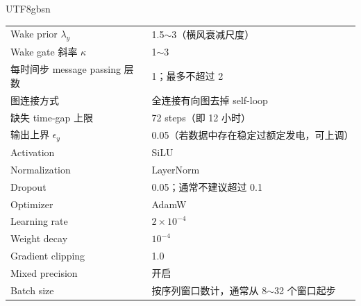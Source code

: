 \documentclass[11pt]{article}
\begin{document}
\begin{CJK}{UTF8}{gbsn}
\begin{table}[!ht]
\begin{tabularx}{0.96\linewidth}{@{}lX@{}}
Wake prior \(\lambda_y\)              & 1.5\(\sim\)3（横风衰减尺度）                                                      \\
Wake gate 斜率 \(\kappa\)             & 1\(\sim\)3                                                                       \\
每时间步 message passing 层数          & 1；最多不超过 2                                                                    \\
图连接方式                             & 全连接有向图去掉 self-loop                                                        \\
缺失 time-gap 上限                     & 72 steps（即 12 小时）                                                             \\
输出上界 $\epsilon_y$                 & 0.05（若数据中存在稳定过额定发电，可上调）                                             \\
Activation                             & SiLU                                                                              \\
Normalization                          & LayerNorm                                                                         \\
Dropout                                & 0.05；通常不建议超过 0.1                                                          \\
Optimizer                              & AdamW                                                                             \\
Learning rate                          & \(2\times 10^{-4}\)                                                               \\
Weight decay                           & \(10^{-4}\)                                                                       \\
Gradient clipping                      & 1.0                                                                               \\
Mixed precision                        & 开启                                                                              \\
Batch size                             & 按序列窗口数计，通常从 8\(\sim\)32 个窗口起步                                     \\
\hline
\end{tabularx}
\end{table}


\end{CJK}
\end{document}
